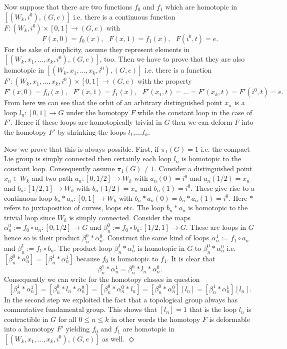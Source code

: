 \documentclass[a4paper,12pt,draft]{article}
\begin{document}
Now suppose that there are two functions $f_0$ and $f_1$
which are homotopic in $\left[ (W_k, i^0), (G,e)\right]$ i.e.
there is a continuous function $F: (W_k, i^0)\times
[0,1]\rightarrow (G,e)$ with
\[F(x, 0)=f_0(x),\:\:\:F(x,1)=f_1(x),\:\:\:F(i^0, t)=e.\]
For the sake of simplicity, assume they represent elements in $\left[
(W_k, x_1,...,x_k, i^0), (G,e)\right]$, too. Then we have to
prove that they are also homotopic in $\left[ (W_k, 
x_1,...,x_k, i^0), (G,e)\right]$ i.e. there is a function $F':
(W_k, x_1,...,x_k, i^0)\times 
[0,1]\rightarrow (G,e)$ with the property
\[F'(x,0)=f_0(x),\:\:\:F'(x,1)=f_1(x),\:\:\:F'(x_1,t)=...=F'(x_k,t)=F'(i^0, 
t)=e.\]
From here we can see that the orbit of an arbitrary distinguished point
$x_n$ is a loop $l_n: [0,1]\rightarrow G$ under the homotopy $F$ while
the constant loop in the case of $F'$. Hence if these loops are
homotopically trivial in $G$ then we can deform $F$ into the homotopy $F'$
by shrinking the loops $l_1$,...,$l_k$.

Now we prove that this is always possible. First, if $\pi_1(G)=1$ i.e. the
compact Lie group is simply connected then certainly each loop $l_n$ is
homotopic to the constant loop. Consequently assume $\pi_1(G)\not=1$.
Consider a distinguished point $x_n\in W_k$ and two path $a_n:
[0, 1/2]\rightarrow W_k$ with $a_n(0)=i^0$ and $a_n(1/2)=x_n$
and $b_n: [1/2, 1]\rightarrow W_k$ with $b_n(1/2)= x_n$ and
$b_n(1)=i^0$. These give rise to a continuous loop $b_n*a_n
:[0,1]\rightarrow W_k$ with $b_n*a_n(0)=b_n*a_n(1)=i^0$. Here $*$ refers
to juxtaposition of curves, loops etc. 
The loop $b_n*a_n$ is homotopic to the trivial loop since $W_k$ is
simply connected. Consider the maps $\alpha^0_n:=f_0\circ a_n: [0,
1/2]\rightarrow G$ and $\beta^0_n:=f_0\circ b_n: [1/2,
1]\rightarrow G$. These are loops in $G$ hence so is their product
$\beta^0_n*\alpha^0_n$. Construct the same kind of loops
$\alpha^1_n:=f_1\circ a_n$ and $\beta^1_n:=f_1\circ b_n$.
The product loop $\beta_n^1*\alpha_n^1$ is homotopic in $G$ to
$\beta^0_n*\alpha^0_n$ i.e. 
$[\beta^0_n*\alpha^0_n]=[\beta_n^1*\alpha_n^1]$ because $f_0$ is
homotopic to $f_1$. It is clear that 
\[\beta_n^1*\alpha_n^1 =\beta^0_n*l_n*\alpha^0_n.\]
Consequently we can write for the homotopy classes in question
\[[\beta_n^1*\alpha_n^1]=[\beta^0_n*l_n*\alpha^0_n]=[\beta^0_n*\alpha^0_n
*l_n]=[\beta^0_n*\alpha^0_n][l_n]=[\beta_n^1*\alpha_n^1][l_n].\] 
In the second step we exploited the fact that a topological
group always has commutative fundamental group. This shows that $[l_n]=1$ 
that is the loop $l_n$ is contractible in $G$ for all $0\leq n\leq k$ in
other words the homotopy $F$ is deformable into a homotopy $F'$ yielding
$f_0$ and $f_1$ are homotopic in $\left[ (W_k, x_1,...,x_k, i^0),
(G,e)\right]$ as well. $\Diamond$
\vspace{0.1in}
\end{document}
